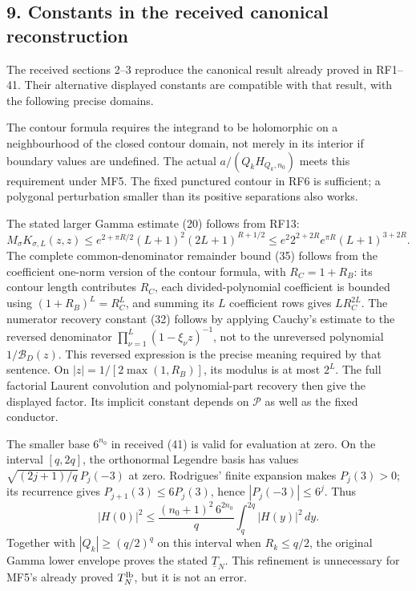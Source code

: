 \documentclass[11pt]{article}
\begin{document}
\subsection{9. Constants in the received canonical reconstruction}\label{constants-in-the-received-canonical-reconstruction}

The received sections 2--3 reproduce the canonical result already proved in RF1--41. Their alternative displayed constants are compatible with that result, with the following precise domains.

The contour formula requires the integrand to be holomorphic on a neighbourhood of the closed contour domain, not merely in its interior if boundary values are undefined. The actual \(a/(Q_kH_{Q_k,n_0})\) meets this requirement under MF5. The fixed punctured contour in RF6 is sufficient; a polygonal perturbation smaller than its positive separations also works.

The stated larger Gamma estimate (20) follows from RF13: \[
M_\sigma K_{\sigma,L}(z,z)
\le e^{2+\pi R/2}(L+1)^2(2L+1)^{R+1/2}
\le e^2 2^{2+2R}e^{\pi R}(L+1)^{3+2R}.
\tag{MF42}
\] The complete common-denominator remainder bound (35) follows from the coefficient one-norm version of the contour formula, with \(R_C=1+R_B\): its contour length contributes \(R_C\), each divided-polynomial coefficient is bounded using \((1+R_B)^L=R_C^L\), and summing its \(L\) coefficient rows gives \(L R_C^{2L}\). The numerator recovery constant (32) follows by applying Cauchy's estimate to the reversed denominator \(\prod_{\nu=1}^{L}(1-\xi_\nu z)^{-1}\), not to the unreversed polynomial \(1/\mathcal B_D(z)\). This reversed expression is the precise meaning required by that sentence. On \(|z|=1/[2\max(1,R_B)]\), its modulus is at most \(2^L\). The full factorial Laurent convolution and polynomial-part recovery then give the displayed factor. Its implicit constant depends on \(\mathscr P\) as well as the fixed conductor.

The smaller base \(6^{n_0}\) in received (41) is valid for evaluation at zero. On the interval \([q,2q]\), the orthonormal Legendre basis has values \(\sqrt{(2j+1)/q}\,P_j(-3)\) at zero. Rodrigues' finite expansion makes \(P_j(3)>0\); its recurrence gives \(P_{j+1}(3)\le6P_j(3)\), hence \(|P_j(-3)|\le6^j\). Thus \[
|H(0)|^2\le\frac{(n_0+1)^2\,6^{2n_0}}q
\int_q^{2q}|H(y)|^2\,dy.
\] Together with \(|Q_k|\ge(q/2)^q\) on this interval when \(R_k\le q/2\), the original Gamma lower envelope proves the stated \(\underline T_N\). This refinement is unnecessary for MF5's already proved \(T_N^{\rm lb}\), but it is not an error.
\end{document}

